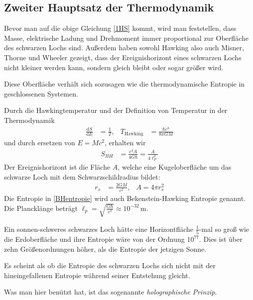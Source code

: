 \documentclass[ngerman]{scrartcl}
\newcommand{\diff}{\mathrm{d}}
\begin{document}
\subsection{Zweiter Hauptsatz der Thermodynamik} \label{zweiterHS}
	Bevor man auf die obige Gleichung \ref{1HS} kommt, wird man feststellen, dass Masse, elektrische Ladung und Drehmoment immer proportional zur Oberfläche des schwarzen Lochs sind. 
	Außerdem haben sowohl Hawking \cite{ParticleCreation} also auch Misner, Thorne und Wheeler \cite{MisnerThorneWheeler} gezeigt, dass der Ereignishorizont eines schwarzen Lochs nicht kleiner werden kann, sondern gleich bleibt oder sogar größer wird. 
	
	Diese Oberfläche verhält sich sozusagen wie die thermodynamische Entropie in geschlossenen Systemen. 
	
	Durch die Hawkingtemperatur und der Definition von Temperatur in der Thermodynamik
	\begin{align} \label{HawkingTemp}
	\frac{\diff S}{\diff E} &= \frac{1}{T},&
	T_{\text{Hawking}} &= \frac{\hbar c^3}{8 \pi G M}
	\end{align}
	und durch ersetzen von $E = Mc^2$, erhalten wir
	\begin{align} \label{BHentropie}
	S_{BH} &= \frac{c^3 A}{4 G \hbar} = \frac{A}{4 \ell_P^2} 
	\end{align}
	Der Ereignishorizont ist die Fläche $A$, welche eine Kugeloberfläche um das schwarze Loch mit dem Schwarzschildradius bildet:
	\begin{align} \label{OberflaecheSH}
	r_s &= \frac{2 GM}{c^2} ,& A = 4 \pi r_s^2 
	\end{align}
	Die Entropie in \eqref{BHentropie} wird auch Bekenstein-Hawking Entropie genannt. Die Plancklänge beträgt $\ell_p = \sqrt{\frac{G \hbar}{c^3}} \approx 10^{-32}\,$m.
	
	Ein sonnen-schweres schwarzes Loch hätte eine Horizontfläche $\frac{1}{5}$-mal so groß wie die Erdoberfläche und ihre Entropie wäre von der Ordnung $10^{77}$. Dies ist über zehn Größenordnungen höher, als die Entropie der jetzigen Sonne.  
	
	Es scheint als ob die Entropie des schwarzen Lochs sich nicht mit der hineingefallenen Entropie während seiner Entstehung gleicht.
	
	Was man hier benützt hat, ist das sogenannte \textit{holographische Prinzip}.
	
\end{document}
